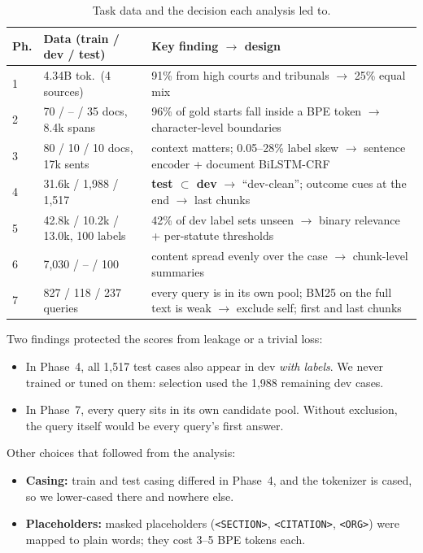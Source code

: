 \begin{table}[t]\centering\footnotesize\setlength{\tabcolsep}{3pt}
\begin{tabularx}{\columnwidth}{@{}l p{2.3cm} X@{}}\toprule
Ph. & Data (train / dev / test) & Key finding $\rightarrow$ design \\\midrule
1 & 4.34B tok.\ (4 sources) & 91\% from high courts and tribunals $\rightarrow$ 25\% equal mix \\
2 & 70 / -- / 35 docs, 8.4k spans & 96\% of gold starts fall inside a BPE token $\rightarrow$ character-level boundaries \\
3 & 80 / 10 / 10 docs, 17k sents & context matters; 0.05--28\% label skew $\rightarrow$ sentence encoder + document BiLSTM-CRF \\
4 & 31.6k / 1,988 / 1,517 & \textbf{test $\subset$ dev} $\rightarrow$ ``dev-clean''; outcome cues at the end $\rightarrow$ last chunks \\
5 & 42.8k / 10.2k / 13.0k, 100 labels & 42\% of dev label sets unseen $\rightarrow$ binary relevance + per-statute thresholds \\
6 & 7,030 / -- / 100 & content spread evenly over the case $\rightarrow$ chunk-level summaries \\
7 & 827 / 118 / 237 queries & every query is in its own pool; BM25 on the full text is weak $\rightarrow$ exclude self; first and last chunks \\\bottomrule
\end{tabularx}
\caption{Task data and the decision each analysis led to.}\label{tab:data}\vspace{-1em}
\end{table}

Two findings protected the scores from leakage or a trivial loss:
\begin{itemize}
\item In Phase~4, all 1,517 test cases also appear in dev \emph{with labels}. We never trained or tuned on them: selection used the 1,988 remaining dev cases.
\item In Phase~7, every query sits in its own candidate pool. Without exclusion, the query itself would be every query's first answer.
\end{itemize}

Other choices that followed from the analysis:
\begin{itemize}
\item \textbf{Casing:} train and test casing differed in Phase~4, and the tokenizer is cased, so we lower-cased there and nowhere else.
\item \textbf{Placeholders:} masked placeholders (\texttt{<SECTION>}, \texttt{<CITATION>}, \texttt{<ORG>}) were mapped to plain words; they cost 3--5 BPE tokens each.
\end{itemize}

